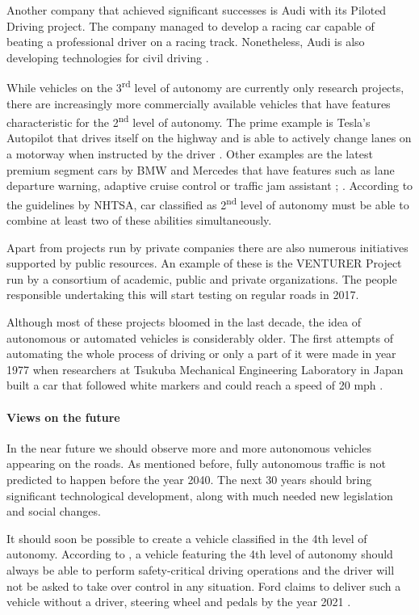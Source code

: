 \documentclass[11pt,english,twoside]{article}
\begin{document}
\par
Another company that achieved significant successes is Audi with its Piloted Driving project. The company managed to develop a racing car capable of beating a professional driver on a racing track. Nonetheless, Audi is also developing technologies for civil driving \citep{audi1}.

\par


While vehicles on the 3\textsuperscript{rd} level of autonomy are currently only research projects, there are increasingly more commercially available vehicles that have features characteristic for the 2\textsuperscript{nd} level of autonomy. The prime example is Tesla's Autopilot that drives itself on the highway and is able to actively change lanes on a motorway when instructed by the driver \citep{tesla2}. Other examples are the latest premium segment cars by BMW and Mercedes that have features such as lane departure warning, adaptive cruise control or traffic jam assistant \citep{bmw}; \citep{mercedes1}. According to the guidelines by NHTSA, car classified as 2\textsuperscript{nd} level of autonomy must be able to combine at least two of these abilities simultaneously.


\par

Apart from projects run by private companies there are also numerous initiatives supported by public resources. An example of these is the VENTURER Project run by a consortium of academic, public and private  organizations. The people responsible undertaking this will start testing on regular roads in 2017.

\par
Although most of these projects bloomed in the last decade, the idea of autonomous or automated vehicles is considerably older. The first attempts of automating the whole process of driving or only a part of it were made in year 1977 when researchers at Tsukuba Mechanical Engineering Laboratory in Japan built a car that followed white markers and could reach a speed of 20 mph \citep{forrest2007autonomous}.





\paragraph{Views on the future}
In the near future we should observe more and more autonomous vehicles appearing on the roads. As mentioned before, fully autonomous traffic is not predicted to happen before the year 2040. The next 30 years should bring significant technological development, along with much needed new legislation and social changes.
\par
It should soon be possible to create a vehicle classified in the 4th level of autonomy. According to \citet{nhtsa1}, a vehicle featuring the 4th level of autonomy should always be able to perform safety-critical driving operations and the driver will not be asked to take over control in any situation. Ford claims to deliver such a vehicle without a driver, steering wheel and pedals by the year 2021 \citep{ford1}.
\end{document}
